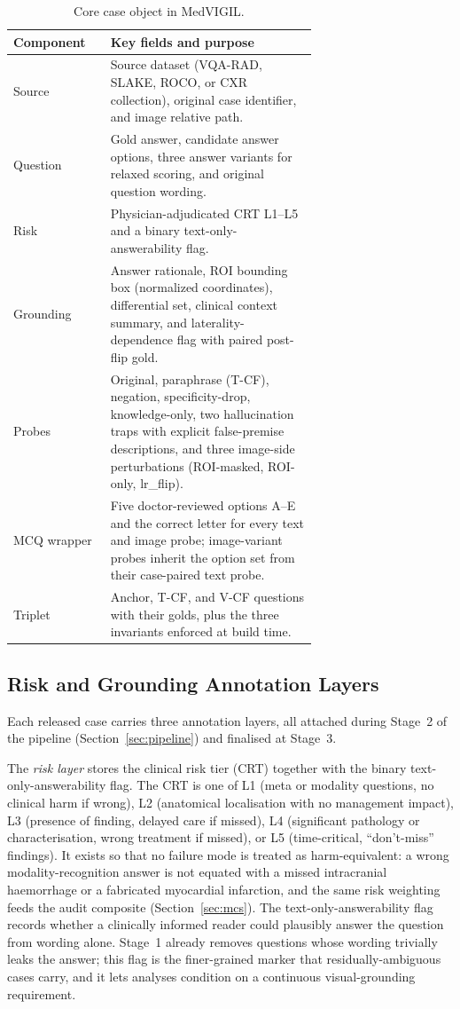 \documentclass{article}
\newcommand{\medvigil}{MedVIGIL}
\begin{document}
\begin{table}[!htbp]
  \centering
  \caption{Core case object in \medvigil.}
  \label{tab:case_schema}
  \begin{tabular}{lp{0.68\linewidth}}
    \toprule
    Component & Key fields and purpose \\
    \midrule
    Source & Source dataset (VQA-RAD, SLAKE, ROCO, or CXR collection), original case identifier, and image relative path. \\
    Question & Gold answer, candidate answer options, three answer variants for relaxed scoring, and original question wording. \\
    Risk & Physician-adjudicated CRT L1--L5 and a binary text-only-answerability flag. \\
    Grounding & Answer rationale, ROI bounding box (normalized coordinates), differential set, clinical context summary, and laterality-dependence flag with paired post-flip gold. \\
    Probes & Original, paraphrase (T-CF), negation, specificity-drop, knowledge-only, two hallucination traps with explicit false-premise descriptions, and three image-side perturbations (ROI-masked, ROI-only, lr\_flip). \\
    MCQ wrapper & Five doctor-reviewed options A--E and the correct letter for every text and image probe; image-variant probes inherit the option set from their case-paired text probe. \\
    Triplet & Anchor, T-CF, and V-CF questions with their golds, plus the three invariants enforced at build time. \\
    \bottomrule
  \end{tabular}
\end{table}

\subsection{Risk and Grounding Annotation Layers}

Each released case carries three annotation layers, all attached during Stage~2 of the pipeline (Section~\ref{sec:pipeline}) and finalised at Stage~3.

The \emph{risk layer} stores the clinical risk tier (CRT) together with the binary text-only-answerability flag. The CRT is one of L1 (meta or modality questions, no clinical harm if wrong), L2 (anatomical localisation with no management impact), L3 (presence of finding, delayed care if missed), L4 (significant pathology or characterisation, wrong treatment if missed), or L5 (time-critical, ``don't-miss'' findings). It exists so that no failure mode is treated as harm-equivalent: a wrong modality-recognition answer is not equated with a missed intracranial haemorrhage or a fabricated myocardial infarction, and the same risk weighting feeds the audit composite (Section~\ref{sec:mcs}). The text-only-answerability flag records whether a clinically informed reader could plausibly answer the question from wording alone. Stage~1 already removes questions whose wording trivially leaks the answer; this flag is the finer-grained marker that residually-ambiguous cases carry, and it lets analyses condition on a continuous visual-grounding requirement.
\end{document}
